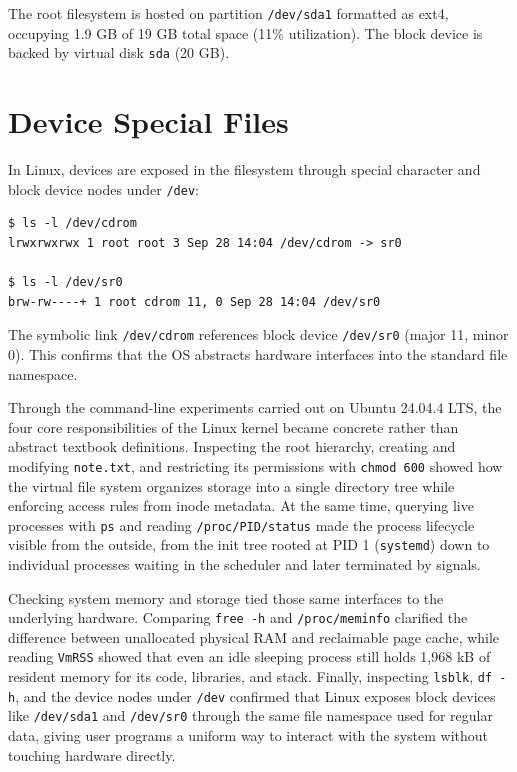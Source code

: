 \documentclass{assets/utmreport}
\begin{document}
The root filesystem is hosted on partition \texttt{/dev/sda1} formatted as ext4, occupying 1.9 GB of 19 GB total space (11\% utilization). The block device is backed by virtual disk \texttt{sda} (20 GB).

\section{Device Special Files}
In Linux, devices are exposed in the filesystem through special character and block device nodes under \texttt{/dev}:
\begin{verbatim}
$ ls -l /dev/cdrom
lrwxrwxrwx 1 root root 3 Sep 28 14:04 /dev/cdrom -> sr0

$ ls -l /dev/sr0
brw-rw----+ 1 root cdrom 11, 0 Sep 28 14:04 /dev/sr0
\end{verbatim}
The symbolic link \texttt{/dev/cdrom} references block device \texttt{/dev/sr0} (major 11, minor 0). This confirms that the OS abstracts hardware interfaces into the standard file namespace.

\utmconclusions
Through the command-line experiments carried out on Ubuntu 24.04.4 LTS, the four core responsibilities of the Linux kernel became concrete rather than abstract textbook definitions. Inspecting the root hierarchy, creating and modifying \texttt{note.txt}, and restricting its permissions with \texttt{chmod 600} showed how the virtual file system organizes storage into a single directory tree while enforcing access rules from inode metadata. At the same time, querying live processes with \texttt{ps} and reading \texttt{/proc/PID/status} made the process lifecycle visible from the outside, from the init tree rooted at PID 1 (\texttt{systemd}) down to individual processes waiting in the scheduler and later terminated by signals.

Checking system memory and storage tied those same interfaces to the underlying hardware. Comparing \texttt{free -h} and \texttt{/proc/meminfo} clarified the difference between unallocated physical RAM and reclaimable page cache, while reading \texttt{VmRSS} showed that even an idle sleeping process still holds 1,968 kB of resident memory for its code, libraries, and stack. Finally, inspecting \texttt{lsblk}, \texttt{df -h}, and the device nodes under \texttt{/dev} confirmed that Linux exposes block devices like \texttt{/dev/sda1} and \texttt{/dev/sr0} through the same file namespace used for regular data, giving user programs a uniform way to interact with the system without touching hardware directly.
\end{document}
